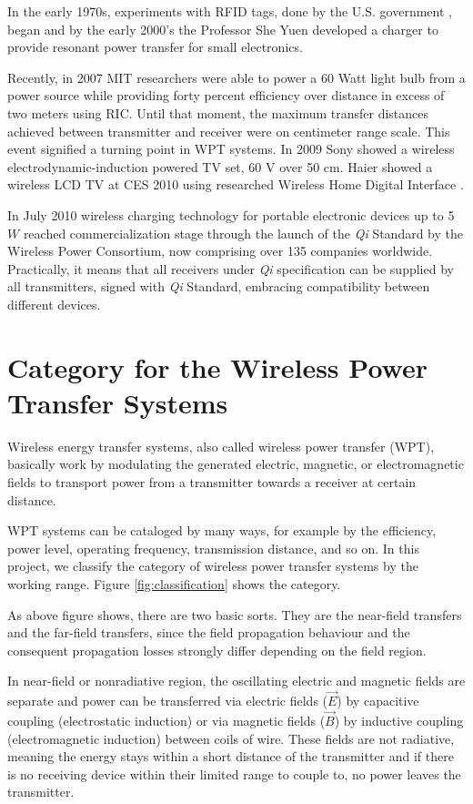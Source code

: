 In the early 1970s, experiments with RFID tags, done by the U.S. government \cite{RFID}, began and by the early 2000's the Professor She Yuen developed a charger to provide resonant power transfer for small electronics. 

Recently, in 2007 MIT researchers were able to power a 60 Watt light bulb from a power source while providing forty percent efficiency over distance in excess of two meters using RIC. Until that moment, the maximum transfer distances achieved between transmitter and receiver were on centimeter range scale. This event signified a turning point in WPT systems. In 2009 Sony showed a wireless electrodynamic-induction powered TV set, 60 V over 50 cm. Haier showed a wireless LCD TV at CES 2010 using researched Wireless Home Digital Interface \cite{medical}.

In July 2010 wireless charging technology for portable electronic devices up to 5 $W$ reached commercialization stage through the launch of the \textit{Qi} Standard by the Wireless Power Consortium, now comprising over 135 companies worldwide. Practically, it means that all receivers under \textit{Qi} specification can be supplied by all transmitters, signed with \textit{Qi} Standard, embracing compatibility between different devices.


\section{Category for the Wireless Power Transfer Systems} 

Wireless energy transfer systems, also called wireless power transfer (WPT), basically work by modulating the generated electric, magnetic, or electromagnetic fields to transport power from a transmitter towards a receiver at certain distance.

WPT systems can be cataloged by many ways, for example by the efficiency, power level, operating frequency, transmission distance, and so on. In this project, we classify the category of wireless power transfer systems by the working range. Figure \ref{fig:classification} shows the category.

As above figure shows, there are two basic sorts. They are the near-field transfers and the far-field transfers, since the field propagation behaviour and the consequent propagation losses strongly differ depending on the field region. 

In near-field or nonradiative region, the oscillating electric and magnetic fields are separate \cite{sazonov2014wearable} and power can be transferred via electric fields ($\vec{E}$) by capacitive coupling (electrostatic induction) or via magnetic fields ($\vec{B}$) by inductive coupling (electromagnetic induction) between coils of wire. These fields are not radiative, meaning the energy stays within a short distance of the transmitter and if there is no receiving device within their limited range to couple to, no power leaves the transmitter. 

